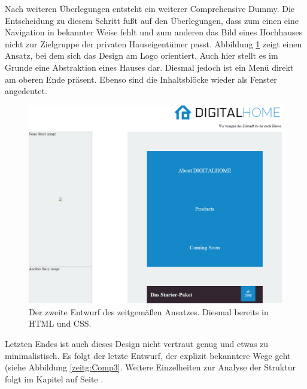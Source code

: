 Nach weiteren Überlegungen entsteht ein weiterer Comprehensive Dummy. Die Entscheidung zu diesem Schritt fußt auf den Überlegungen, dass zum einen eine Navigation in bekannter Weise fehlt und zum anderen das Bild eines Hochhauses nicht zur Zielgruppe der privaten Hauseigentümer passt.
Abbildung \ref{zeitg:Comp2} zeigt einen Ansatz, bei dem sich das Design am Logo orientiert. Auch hier stellt es im Grunde eine Abstraktion eines Hauses dar. Diesmal jedoch ist ein Menü direkt am oberen Ende präsent. Ebenso sind die Inhaltsblöcke wieder als Fenster angedeutet.

\begin{figure} [ht]
	\includegraphics[width=\textwidth]{./img/zeitg_comp2.png}
	\caption{Der zweite Entwurf des zeitgemäßen Ansatzes. Diesmal bereits in HTML und CSS.}
	\label{zeitg:Comp2}
\end{figure}

Letzten Endes ist auch dieses Design nicht vertraut genug und etwas zu minimalistisch. Es folgt der letzte Entwurf, der explizit bekanntere Wege geht (siehe Abbildung \ref{zeitg:Comp3}. Weitere Einzelheiten zur Analyse der Struktur folgt im Kapitel  auf Seite \pageref{zeitg:struktur}.

